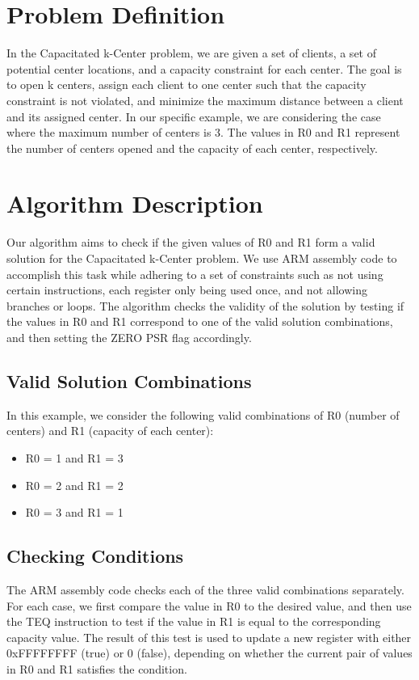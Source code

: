 \section{Problem Definition}

In the Capacitated k-Center problem, we are given a set of clients, a set of potential center locations, and a capacity constraint for each center. The goal is to open k centers, assign each client to one center such that the capacity constraint is not violated, and minimize the maximum distance between a client and its assigned center. In our specific example, we are considering the case where the maximum number of centers is 3. The values in R0 and R1 represent the number of centers opened and the capacity of each center, respectively. 

\section{Algorithm Description}

Our algorithm aims to check if the given values of R0 and R1 form a valid solution for the Capacitated k-Center problem. We use ARM assembly code to accomplish this task while adhering to a set of constraints such as not using certain instructions, each register only being used once, and not allowing branches or loops. The algorithm checks the validity of the solution by testing if the values in R0 and R1 correspond to one of the valid solution combinations, and then setting the ZERO PSR flag accordingly.

\subsection{Valid Solution Combinations}

In this example, we consider the following valid combinations of R0 (number of centers) and R1 (capacity of each center):

\begin{itemize}
    \item R0 = 1 and R1 = 3
    \item R0 = 2 and R1 = 2
    \item R0 = 3 and R1 = 1
\end{itemize}

\subsection{Checking Conditions}

The ARM assembly code checks each of the three valid combinations separately. For each case, we first compare the value in R0 to the desired value, and then use the TEQ instruction to test if the value in R1 is equal to the corresponding capacity value. The result of this test is used to update a new register with either 0xFFFFFFFF (true) or 0 (false), depending on whether the current pair of values in R0 and R1 satisfies the condition.

